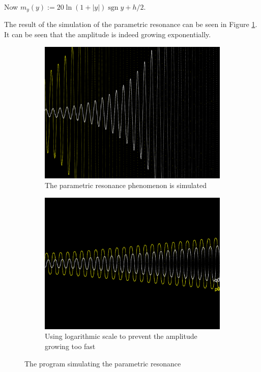\documentclass[12pt]{article}
\begin{document}
Now $m_y\left(y\right):=20\ln\left(1+\left|y\right|\right)\operatorname{sgn}y+h/2$.

The result of the simulation of the parametric resonance can be seen in Figure \ref{fig:parametric}.
It can be seen that the amplitude is indeed growing exponentially.

\begin{figure}[h]
  \centering
  \begin{subfigure}[b]{0.45\linewidth}
    \includegraphics[width=\linewidth]{parametric_resonance.png}
    \caption{The parametric resonance phenomenon is simulated}
  \end{subfigure}
  \begin{subfigure}[b]{0.45\linewidth}
    \includegraphics[width=\linewidth]{parametric_resonance_logarithmic.png}
    \caption{Using logarithmic scale to prevent the amplitude growing too fast}
  \end{subfigure}
  \caption{The program simulating the parametric resonance}
  \label{fig:parametric}
\end{figure}
\end{document}
